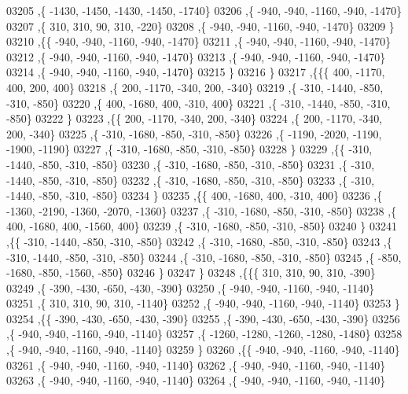 \begin{DoxyCode}
03205     ,\{ -1430, -1450, -1430, -1450, -1740\}
03206     ,\{  -940,  -940, -1160,  -940, -1470\}
03207     ,\{   310,   310,    90,   310,  -220\}
03208     ,\{  -940,  -940, -1160,  -940, -1470\}
03209     \}
03210    ,\{\{  -940,  -940, -1160,  -940, -1470\}
03211     ,\{  -940,  -940, -1160,  -940, -1470\}
03212     ,\{  -940,  -940, -1160,  -940, -1470\}
03213     ,\{  -940,  -940, -1160,  -940, -1470\}
03214     ,\{  -940,  -940, -1160,  -940, -1470\}
03215     \}
03216    \}
03217   ,\{\{\{   400, -1170,   400,   200,   400\}
03218     ,\{   200, -1170,  -340,   200,  -340\}
03219     ,\{  -310, -1440,  -850,  -310,  -850\}
03220     ,\{   400, -1680,   400,  -310,   400\}
03221     ,\{  -310, -1440,  -850,  -310,  -850\}
03222     \}
03223    ,\{\{   200, -1170,  -340,   200,  -340\}
03224     ,\{   200, -1170,  -340,   200,  -340\}
03225     ,\{  -310, -1680,  -850,  -310,  -850\}
03226     ,\{ -1190, -2020, -1190, -1900, -1190\}
03227     ,\{  -310, -1680,  -850,  -310,  -850\}
03228     \}
03229    ,\{\{  -310, -1440,  -850,  -310,  -850\}
03230     ,\{  -310, -1680,  -850,  -310,  -850\}
03231     ,\{  -310, -1440,  -850,  -310,  -850\}
03232     ,\{  -310, -1680,  -850,  -310,  -850\}
03233     ,\{  -310, -1440,  -850,  -310,  -850\}
03234     \}
03235    ,\{\{   400, -1680,   400,  -310,   400\}
03236     ,\{ -1360, -2190, -1360, -2070, -1360\}
03237     ,\{  -310, -1680,  -850,  -310,  -850\}
03238     ,\{   400, -1680,   400, -1560,   400\}
03239     ,\{  -310, -1680,  -850,  -310,  -850\}
03240     \}
03241    ,\{\{  -310, -1440,  -850,  -310,  -850\}
03242     ,\{  -310, -1680,  -850,  -310,  -850\}
03243     ,\{  -310, -1440,  -850,  -310,  -850\}
03244     ,\{  -310, -1680,  -850,  -310,  -850\}
03245     ,\{  -850, -1680,  -850, -1560,  -850\}
03246     \}
03247    \}
03248   ,\{\{\{   310,   310,    90,   310,  -390\}
03249     ,\{  -390,  -430,  -650,  -430,  -390\}
03250     ,\{  -940,  -940, -1160,  -940, -1140\}
03251     ,\{   310,   310,    90,   310, -1140\}
03252     ,\{  -940,  -940, -1160,  -940, -1140\}
03253     \}
03254    ,\{\{  -390,  -430,  -650,  -430,  -390\}
03255     ,\{  -390,  -430,  -650,  -430,  -390\}
03256     ,\{  -940,  -940, -1160,  -940, -1140\}
03257     ,\{ -1260, -1280, -1260, -1280, -1480\}
03258     ,\{  -940,  -940, -1160,  -940, -1140\}
03259     \}
03260    ,\{\{  -940,  -940, -1160,  -940, -1140\}
03261     ,\{  -940,  -940, -1160,  -940, -1140\}
03262     ,\{  -940,  -940, -1160,  -940, -1140\}
03263     ,\{  -940,  -940, -1160,  -940, -1140\}
03264     ,\{  -940,  -940, -1160,  -940, -1140\}

\end{DoxyCode}
